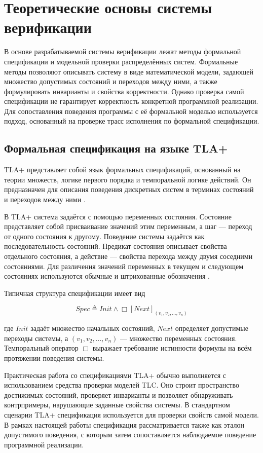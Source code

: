\section{Теоретические основы системы верификации}

В основе разрабатываемой системы верификации лежат методы формальной
спецификации и модельной проверки распределённых систем. Формальные
методы позволяют описывать систему в виде математической модели,
задающей множество допустимых состояний и переходов между ними, а
также формулировать инварианты и свойства корректности. Однако
проверка самой спецификации не гарантирует корректность конкретной
программной реализации. Для сопоставления поведения программы с её
формальной моделью используется подход, основанный на проверке трасс
исполнения по формальной спецификации.

\subsection{Формальная спецификация на языке TLA+}

TLA+ представляет собой язык формальных спецификаций, основанный на
теории множеств, логике первого порядка и темпоральной логике
действий. Он предназначен для описания поведения дискретных систем в
терминах состояний и переходов между ними \cite{lamport08}.

В TLA+ система задаётся с помощью переменных состояния. Состояние
представляет собой присваивание значений этим переменным, а шаг ---
переход от одного состояния к другому. Поведение системы задаётся как
последовательность состояний. Предикат состояния описывает свойства
отдельного состояния, а действие --- свойства перехода между двумя
соседними состояниями. Для различения значений переменных в текущем и
следующем состояниях используются обычные и штрихованные обозначения
\cite{habrias06}.

Типичная структура спецификации имеет вид

$$
Spec \triangleq Init \wedge \Box [Next]_{(v_1, v_2, \dots, v_n)}
$$

где $Init$ задаёт множество начальных состояний, $Next$ определяет
допустимые переходы системы, а $(v_1, v_2, \dots, v_n)$ --- множество
переменных состояния. Темпоральный оператор $\Box$ выражает требование
истинности формулы на всём протяжении поведения системы.

Практическая работа со спецификациями TLA+ обычно выполняется с
использованием средства проверки моделей TLC. Оно строит пространство
достижимых состояний, проверяет инварианты и позволяет обнаруживать
контрпримеры, нарушающие заданные свойства системы. В стандартном
сценарии TLA+ спецификация используется для проверки свойств самой
модели. В рамках настоящей работы спецификация рассматривается также
как эталон допустимого поведения, с которым затем сопоставляется
наблюдаемое поведение программной реализации.

